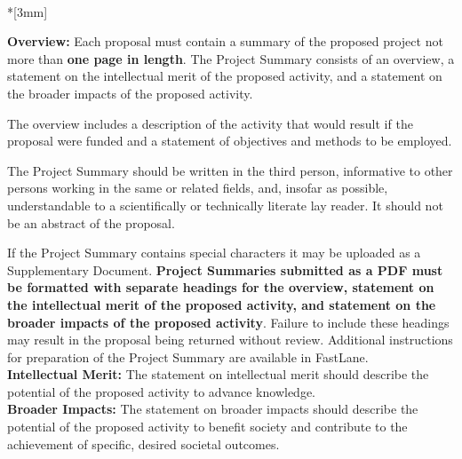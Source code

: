 \documentclass{proposalnsf}
\renewcommand{\title}{\noindent {\Large{\bf Here Goes Your Title!}}}
\begin{document}

{\bf \title} \\*[3mm]

{\bf Overview:} Each proposal must contain a summary of the proposed project not more than {\bf one page in length}. The Project
Summary consists of an overview, a statement on the intellectual merit of the proposed activity, and a statement
on the broader impacts of the proposed activity.

The overview includes a description of the activity that would result if the proposal were funded and a statement
of objectives and methods to be employed.  

The Project Summary should be written in the third person, informative to other persons working in
the same or related fields, and, insofar as possible, understandable to a scientifically or technically 
literate lay reader. It should not be an abstract of the proposal.

If the Project Summary contains special characters it may be uploaded as a Supplementary Document.
{\bf Project Summaries submitted as a PDF must be formatted with separate headings for the overview, statement on the
intellectual merit of the proposed activity, and statement on the broader impacts of the proposed activity}. Failure
to include these headings may result in the proposal being returned without review.
Additional instructions for preparation of the Project Summary are available in FastLane.\\

{\bf Intellectual Merit:} The statement on intellectual merit should describe the potential of
the proposed activity to advance knowledge.\\

{\bf Broader Impacts: } The statement on broader impacts should describe the potential of
the proposed activity to benefit society and contribute to the achievement of specific, 
desired societal outcomes.

\renewcommand{\thepage} {B--\arabic{page}}
\newpage




\end{document}

